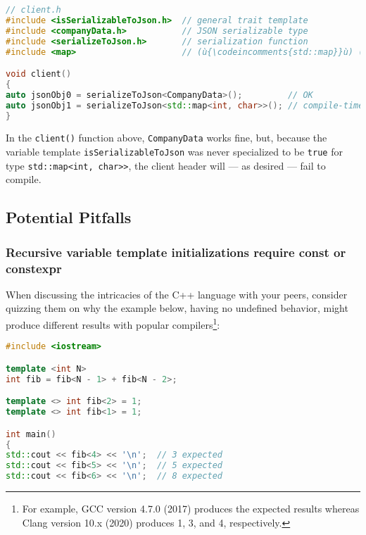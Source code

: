 {\begin{lstlisting}[language=C++]
// client.h
#include <isSerializableToJson.h>  // general trait template
#include <companyData.h>           // JSON serializable type
#include <serializeToJson.h>       // serialization function
#include <map>                     // (ù{\codeincomments{std::map}}ù) (not JSON serializable)

void client()
{
auto jsonObj0 = serializeToJson<CompanyData>();         // OK
auto jsonObj1 = serializeToJson<std::map<int, char>>(); // compile-time error
}
\end{lstlisting}

\noindent In the \texttt{client()} function above, \texttt{CompanyData} works
fine, but, because the variable template \texttt{isSerializableToJson}
was never specialized to be \texttt{true} for type
\mbox{\texttt{std::map<int,} \texttt{char>>}}, the client header will --- as
desired --- fail to compile.

\subsection[Potential Pitfalls]{Potential Pitfalls}\label{variabletemplate-potential-pitfalls}

\subsubsection[Recursive variable template initializations require {\tt const} or {\tt constexpr}]{Recursive variable template initializations require {\SubsubsecCode const} or {\SubsubsecCode constexpr}}\label{recursive-variable-template-initializations-require-const-or-constexpr}

When discussing the intricacies of the C++ language with your peers, consider quizzing them on why the
example below, having no undefined behavior, might produce different results with popular compilers{\cprotect\footnote{For
example, GCC version 4.7.0 (2017) produces the expected results whereas
Clang version 10.x (2020) produces 1, 3, and 4, respectively.}}:

\begin{lstlisting}[language=C++]
#include <iostream>

template <int N>
int fib = fib<N - 1> + fib<N - 2>;

template <> int fib<2> = 1;
template <> int fib<1> = 1;

int main()
{
std::cout << fib<4> << '\n';  // 3 expected
std::cout << fib<5> << '\n';  // 5 expected
std::cout << fib<6> << '\n';  // 8 expected


\end{lstlisting}}
